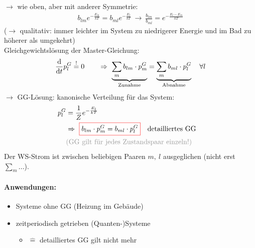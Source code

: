$\rightarrow$ wie oben, aber mit anderer Symmetrie:
\begin{align}
    b_{lm} e^{-\frac{E_m}{kT}} = b_{ml}e^{-\frac{E_l}{kT}} \ \rightarrow \ \frac{b_{lm}}{b_{ml}} = e^{-\frac{E_l-E_m}{kT}}
\end{align}
\color{black!40} ($\rightarrow$ qualitativ: immer leichter im System zu niedrigerer Energie und im Bad zu höherer als umgekehrt) \color{black}\\
Gleichgewichtslösung der Master-Gleichung:
\begin{align}
    \dv{}{t} p_l^G \stackrel{!}{=} 0 \qquad \Rightarrow \ \underbrace{\sum_m b_{lm}\cdot p_m^G}_{\text{Zunahme}} = \underbrace{\sum_m b_{ml}\cdot p_l^G}_{\text{Abnahme}} \quad \forall l
\end{align}
$\rightarrow$ GG-Lösung: kanonische Verteilung für das System:
\begin{align}
    p_l^G &= \frac{1}{Z}e^{-\frac{E_l}{kT}}\\
    &\Rightarrow \ \fcolorbox{red}{white}{$b_{lm}\cdot p_m^G = b_{ml}\cdot p_l^G$} \qq{detailliertes GG}\\
    &\text{\color{black!40} (GG gilt für jedes Zustandspaar einzeln!)}
\end{align}
Der WS-Strom ist zwischen beliebigen Paaren $m, \ l$ ausgeglichen (nicht erst $\sum_m ...$).
\paragraph{Anwendungen:}
\begin{itemize}
    \item Systeme ohne GG (Heizung im Gebäude)
    \item zeitperiodisch getrieben (Quanten-)Systeme
    \begin{itemize}
        \item {} $\widehat{=}$ detailliertes GG gilt nicht mehr
    \end{itemize}
\end{itemize}